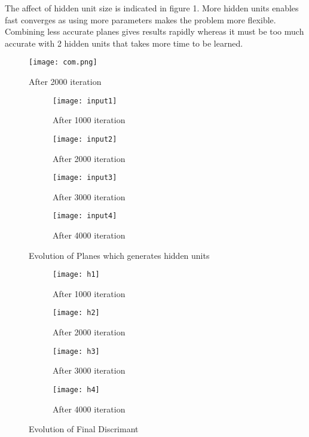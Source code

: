 \documentclass[12pt]{amsart}
\begin{document}
The affect of hidden unit size is indicated in figure 1. More hidden units enables fast converges as using more parameters makes the problem 
more flexible. Combining less accurate planes gives results rapidly whereas it must be too much accurate with 2 hidden units that takes more time to be learned.
\begin{figure}[H]
  \centering
  \texttt{[image: com.png]}
  \caption{After 2000 iteration}
  \label{fig:sfig2}
\end{figure}



\begin{figure}[H]
\begin{subfigure}{.4\textwidth}
  \centering
  \texttt{[image: input1]}
  \caption{After 1000 iteration}
  \label{fig:sfig2}
\end{subfigure}
\begin{subfigure}{.4\textwidth}
  \centering
  \texttt{[image: input2]}
  \caption{After 2000 iteration}
  \label{fig:sfig2}
\end{subfigure}
\begin{subfigure}{.4\textwidth}
  \centering
  \texttt{[image: input3]}
  \caption{After 3000 iteration}
  \label{fig:sfig2}
\end{subfigure}
\begin{subfigure}{.4\textwidth}
  \centering
  \texttt{[image: input4]}
  \caption{After 4000 iteration}
  \label{fig:sfig2}
\end{subfigure}
\caption{Evolution of Planes which generates hidden units}
\label{fig:fig}
\end{figure}
\begin{figure}[H]
\begin{subfigure}{.4\textwidth}
  \centering
  \texttt{[image: h1]}
  \caption{After 1000 iteration}
  \label{fig:sfig2}
\end{subfigure}
\begin{subfigure}{.4\textwidth}
  \centering
  \texttt{[image: h2]}
  \caption{After 2000 iteration}
  \label{fig:sfig2}
\end{subfigure}
\begin{subfigure}{.4\textwidth}
  \centering
  \texttt{[image: h3]}
  \caption{After 3000 iteration}
  \label{fig:sfig2}
\end{subfigure}
\begin{subfigure}{.4\textwidth}
  \centering
  \texttt{[image: h4]}
  \caption{After 4000 iteration}
  \label{fig:sfig2}
\end{subfigure}
\caption{Evolution of Final Discrimant}
\label{fig:fig}
\end{figure}
\end{document}

